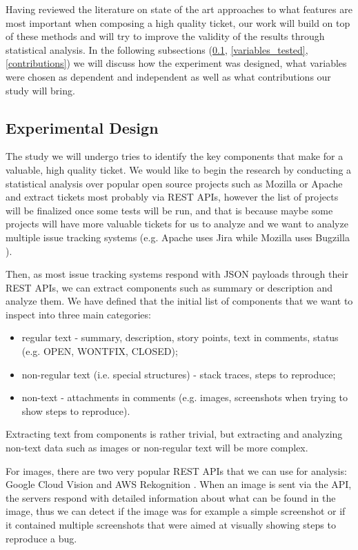 \documentclass{mprop}
\begin{document}
Having reviewed the literature on state of the art approaches to what features
are most important when composing a high quality ticket, our work will
build on top of these methods and will try to improve the validity of the
results through statistical analysis. In the following subsections 
(\ref{experimental_design}, \ref{variables_tested}, \ref{contributions}) we will
discuss how the experiment was designed, what variables were chosen
as dependent and independent as well as what contributions our study will bring.

\subsection{Experimental Design}\label{experimental_design}

The study we will undergo tries to identify the key components that make
for a valuable, high quality ticket. We would like to begin the research by 
conducting a statistical analysis 
over popular open source projects such as Mozilla or Apache and extract 
tickets most probably via REST APIs, however the list of projects
will be finalized once some tests will be run, and that is because
maybe some projects will have more valuable tickets for us to analyze and
we want to analyze multiple issue tracking systems 
(e.g. Apache uses Jira \citep{jira} while Mozilla uses Bugzilla 
\citep{bugzilla}). 

Then, as most issue tracking systems respond with JSON payloads through 
their REST APIs, we can extract components such as summary or 
description and analyze them. We have defined that the initial list of 
components that we want to inspect into three main categories:
  \begin{itemize}
    \item regular text - summary, description, story points, 
      text in comments, status (e.g. OPEN, WONTFIX, CLOSED);
    \item non-regular text (i.e. special structures) - stack traces,
      steps to reproduce;
    \item non-text - attachments in comments (e.g. images, screenshots
      when trying to show steps to reproduce).
  \end{itemize}

Extracting text from components is rather trivial, but extracting and 
analyzing non-text data such as images or non-regular text will be 
more complex. 

For images, there are two very popular REST APIs that 
we can use for analysis: Google Cloud Vision \citep{vision} and 
AWS Rekognition \citep{rekognition}. When an image is sent via the API,
the servers respond with detailed information about what can be found
in the image, thus we can detect if the image was for example a 
simple screenshot or if it contained multiple screenshots that were aimed
at visually showing steps to reproduce a bug.
\end{document}
